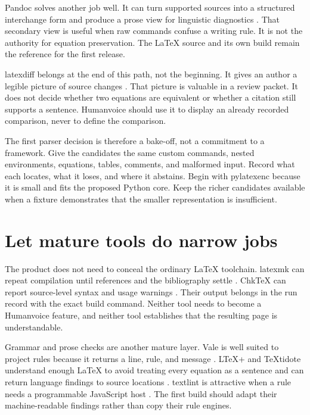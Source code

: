 Pandoc solves another job well. It can turn supported sources into a structured
interchange form and produce a prose view for linguistic diagnostics
\citep{pandoc2026filters}. That secondary view is useful when raw commands
confuse a writing rule. It is not the authority for equation preservation. The
LaTeX source and its own build remain the reference for the first release.

latexdiff belongs at the end of this path, not the beginning. It gives an author
a legible picture of source changes \citep{latexdiff2026}. That picture is
valuable in a review packet. It does not decide whether two equations are
equivalent or whether a citation still supports a sentence. Humanvoice should
use it to display an already recorded comparison, never to define the
comparison.

The first parser decision is therefore a bake-off, not a commitment to a
framework. Give the candidates the same custom commands, nested environments,
equations, tables, comments, and malformed input. Record what each locates,
what it loses, and where it abstains. Begin with pylatexenc because it is small
and fits the proposed Python core. Keep the richer candidates available when a
fixture demonstrates that the smaller representation is insufficient.

\section{Let mature tools do narrow jobs}
\label{sec:component-narrow-tools}

The product does not need to conceal the ordinary LaTeX toolchain. latexmk can
repeat compilation until references and the bibliography settle
\citep{latexmk2026}. ChkTeX can report source-level syntax and usage warnings
\citep{chktex2026}. Their output belongs in the run record with the exact build
command. Neither tool needs to become a Humanvoice feature, and neither tool
establishes that the resulting page is understandable.

Grammar and prose checks are another mature layer. Vale is well suited to
project rules because it returns a line, rule, and message
\citep{vale2026docs}. LTeX+ and TeXtidote understand enough LaTeX to avoid
treating every equation as a sentence and can return language findings to
source locations \citep{ltexplus2026}. textlint is attractive when a rule needs
a programmable JavaScript host \citep{textlint2026docs}. The first build should
adapt their machine-readable findings rather than copy their rule engines.

